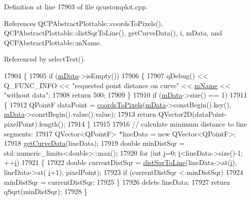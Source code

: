 Definition at line 17903 of file qcustomplot.\+cpp.



References Q\+C\+P\+Abstract\+Plottable\+::coords\+To\+Pixels(), Q\+C\+P\+Abstract\+Plottable\+::dist\+Sqr\+To\+Line(), get\+Curve\+Data(), i, m\+Data, and Q\+C\+P\+Abstract\+Plottable\+::m\+Name.



Referenced by select\+Test().


\begin{DoxyCode}
17904 \{
17905   \textcolor{keywordflow}{if} (\hyperlink{class_q_c_p_curve_a88d533e455bca96004b049e99168731b}{mData}->isEmpty())
17906   \{
17907     qDebug() << Q\_FUNC\_INFO << \textcolor{stringliteral}{"requested point distance on curve"} << \hyperlink{class_q_c_p_abstract_plottable_ac29ffef424e2488675930de18cde612a}{mName} << \textcolor{stringliteral}{"without data"};
17908     \textcolor{keywordflow}{return} 500;
17909   \}
17910   \textcolor{keywordflow}{if} (\hyperlink{class_q_c_p_curve_a88d533e455bca96004b049e99168731b}{mData}->size() == 1)
17911   \{
17912     QPointF dataPoint = \hyperlink{class_q_c_p_abstract_plottable_ade710a776104b14c1c835168ce1bfc5c}{coordsToPixels}(\hyperlink{class_q_c_p_curve_a88d533e455bca96004b049e99168731b}{mData}->constBegin().key(), 
      \hyperlink{class_q_c_p_curve_a88d533e455bca96004b049e99168731b}{mData}->constBegin().value().value);
17913     \textcolor{keywordflow}{return} QVector2D(dataPoint-pixelPoint).length();
17914   \}
17915   
17916   \textcolor{comment}{// calculate minimum distance to line segments:}
17917   QVector<QPointF> *lineData = \textcolor{keyword}{new} QVector<QPointF>;
17918   \hyperlink{class_q_c_p_curve_afa895f8ba9ae34fea6ecea295fd7b1e5}{getCurveData}(lineData);
17919   \textcolor{keywordtype}{double} minDistSqr = std::numeric\_limits<double>::max();
17920   \textcolor{keywordflow}{for} (\textcolor{keywordtype}{int} \hyperlink{_comparision_pictures_2_createtest_image_8m_a6f6ccfcf58b31cb6412107d9d5281426}{i}=0; \hyperlink{_comparision_pictures_2_createtest_image_8m_a6f6ccfcf58b31cb6412107d9d5281426}{i}<lineData->size()-1; ++\hyperlink{_comparision_pictures_2_createtest_image_8m_a6f6ccfcf58b31cb6412107d9d5281426}{i})
17921   \{
17922     \textcolor{keywordtype}{double} currentDistSqr = \hyperlink{class_q_c_p_abstract_plottable_a5ea1cab44ca912dcdc96ed81ec5bed5d}{distSqrToLine}(lineData->at(\hyperlink{_comparision_pictures_2_createtest_image_8m_a6f6ccfcf58b31cb6412107d9d5281426}{i}), lineData->at(
      \hyperlink{_comparision_pictures_2_createtest_image_8m_a6f6ccfcf58b31cb6412107d9d5281426}{i}+1), pixelPoint);
17923     \textcolor{keywordflow}{if} (currentDistSqr < minDistSqr)
17924       minDistSqr = currentDistSqr;
17925   \}
17926   \textcolor{keyword}{delete} lineData;
17927   \textcolor{keywordflow}{return} qSqrt(minDistSqr);
17928 \}
\end{DoxyCode}



